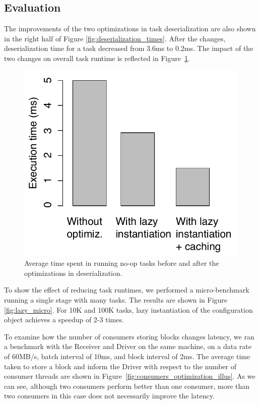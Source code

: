 \subsection{Evaluation}
The improvements of the two optimizations in task deserialization are also shown in the right half of Figure \ref{fig:deserialization_times}. After the changes, deserialization time for a task decreased from 3.6ms to 0.2ms. The impact of the two changes on overall task runtime is reflected in Figure~\ref{fig:runtime_optimizations}.

\begin{figure}[t!]
 \begin{center}
   \includegraphics[scale=0.60]{images_graphs/optimizations/graph3/runtime_optimizations.pdf}
 \end{center}
 \caption{Average time spent in running no-op tasks before and after the optimizations in deserialization.}
 \label{fig:runtime_optimizations}
\end{figure}

To show the effect of reducing task runtimes, we performed a micro-benchmark running a single stage with many tasks. The results are shown in Figure \ref{fig:lazy_micro}. For 10K and 100K tasks, lazy instantiation of the configuration object achieves a speedup of 2-3 times.

To examine how the number of consumers storing blocks changes latency, we ran a benchmark with the Receiver and Driver on the same machine, on a data rate of 60MB/s, batch interval of 10ms, and block interval of 2ms. The average time taken to store a block and inform the Driver with respect to the number of consumer threads are shown in Figure~\ref{fig:consumers_optimization_illus}. As we can see, although two consumers perform better than one consumer, more than two consumers in this case does not necessarily improve the latency.



